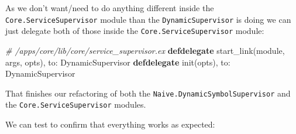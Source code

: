 \documentclass[
  oneside]{book}
\newenvironment{Shaded}{\begin{snugshade}}{\end{snugshade}}
\newcommand{\CommentTok}[1]{\textcolor[rgb]{0.56,0.35,0.01}{\textit{#1}}}
\newcommand{\ConstantTok}[1]{\textcolor[rgb]{0.00,0.00,0.00}{#1}}
\newcommand{\KeywordTok}[1]{\textcolor[rgb]{0.13,0.29,0.53}{\textbf{#1}}}
\newcommand{\NormalTok}[1]{#1}
\newcommand{\VariableTok}[1]{\textcolor[rgb]{0.00,0.00,0.00}{#1}}
\begin{document}
As we don't want/need to do anything different inside the \texttt{Core.ServiceSupervisor} module than the \texttt{DynamicSupervisor} is doing we can just delegate both of those inside the \texttt{Core.ServiceSupervisor} module:

\begin{Shaded}
\begin{Highlighting}[]
  \CommentTok{\# /apps/core/lib/core/service\_supervisor.ex}
  \KeywordTok{defdelegate}\NormalTok{ start\_link(module, args, opts), }\VariableTok{to:} \ConstantTok{DynamicSupervisor}
  \KeywordTok{defdelegate}\NormalTok{ init(opts), }\VariableTok{to:} \ConstantTok{DynamicSupervisor}
\end{Highlighting}
\end{Shaded}

That finishes our refactoring of both the \texttt{Naive.DynamicSymbolSupervisor} and the \texttt{Core.ServiceSupervisor} modules.

We can test to confirm that everything works as expected:
\end{document}
